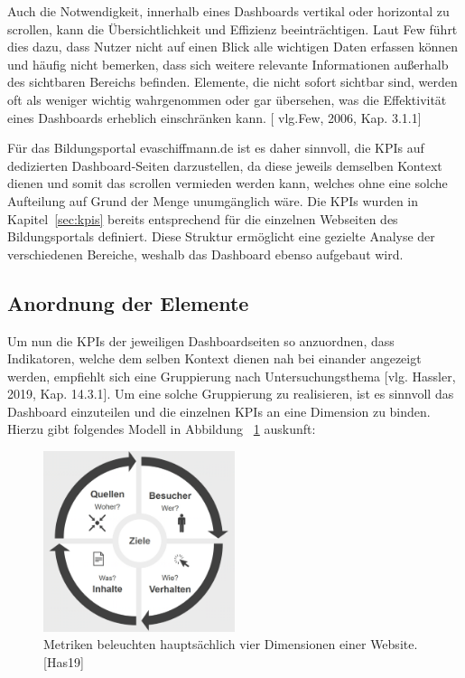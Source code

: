 Auch die Notwendigkeit, innerhalb eines Dashboards vertikal oder horizontal zu scrollen, kann die Übersichtlichkeit und Effizienz beeinträchtigen. Laut Few führt dies dazu, dass Nutzer nicht auf einen Blick alle wichtigen Daten erfassen können und häufig nicht bemerken, dass sich weitere relevante Informationen außerhalb des sichtbaren Bereichs befinden. Elemente, die nicht sofort sichtbar sind, werden oft als weniger wichtig wahrgenommen oder gar übersehen, was die Effektivität eines Dashboards erheblich einschränken kann. [ vlg.Few, 2006, Kap. 3.1.1]

Für das Bildungsportal evaschiffmann.de ist es daher sinnvoll, die KPIs auf dedizierten Dashboard-Seiten darzustellen, da diese jeweils demselben Kontext dienen und somit das scrollen vermieden werden kann, welches ohne eine solche Aufteilung auf Grund der Menge unumgänglich wäre. Die KPIs wurden in Kapitel~\ref{sec:kpis} bereits entsprechend für die einzelnen Webseiten des Bildungsportals definiert. Diese Struktur ermöglicht eine gezielte Analyse der verschiedenen Bereiche, weshalb das Dashboard ebenso aufgebaut wird.

\subsection{Anordnung der Elemente}
Um nun die KPIs der jeweiligen Dashboardseiten so anzuordnen, dass Indikatoren, welche dem selben Kontext dienen nah bei einander angezeigt werden, empfiehlt sich eine Gruppierung nach Untersuchungsthema [vlg. Hassler, 2019, Kap. 14.3.1]. Um eine solche Gruppierung zu realisieren, ist es sinnvoll das Dashboard einzuteilen und die einzelnen KPIs an eine Dimension zu binden. Hierzu gibt folgendes Modell in Abbildung ~\ref{fig:dimensionen} auskunft:

\begin{figure}[h]
    \centering
    \includegraphics[width=0.5\textwidth]{images/dimensionen.png}%
    \caption{Metriken beleuchten hauptsächlich vier Dimensionen einer Website. [Has19]}%
    \label{fig:dimensionen}%
\end{figure}

